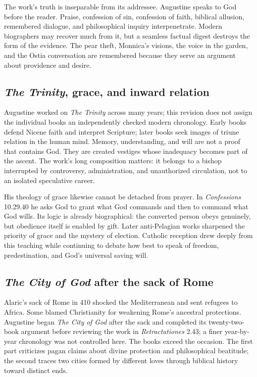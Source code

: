 The work's truth is inseparable from its addressee. Augustine speaks to God
before the reader. Praise, confession of sin, confession of faith, biblical
allusion, remembered dialogue, and philosophical inquiry interpenetrate.
Modern biographers may recover much from it, but a seamless factual digest
destroys the form of the evidence. The pear theft, Monnica's visions, the
voice in the garden, and the Ostia conversation are remembered because they
serve an argument about providence and desire.

\subsection{\emph{The Trinity}, grace, and inward relation}

Augustine worked on \emph{The Trinity} across many years; this revision does
not assign the individual books an independently checked modern chronology.
Early books defend Nicene faith and interpret
Scripture; later books seek images of triune relation in the human mind.
Memory, understanding, and will are not a proof that contains God. They are
created vestiges whose inadequacy becomes part of the ascent. The work's long
composition matters: it belongs to a bishop interrupted by controversy,
administration, and unauthorized circulation, not to an isolated speculative
career.

His theology of grace likewise cannot be detached from prayer. In
\emph{Confessions} 10.29.40 he asks God to grant what God commands and then to
command what God wills. Its logic is already biographical: the converted
person obeys genuinely, but obedience itself is enabled by gift. Later
anti-Pelagian works sharpened the
priority of grace and the mystery of election. Catholic reception drew deeply
from this teaching while continuing to debate how best to speak of freedom,
predestination, and God's universal saving will.

\subsection{\emph{The City of God} after the sack of Rome}

Alaric's sack of Rome in 410 shocked the Mediterranean and sent refugees to
Africa. Some blamed Christianity for weakening Rome's ancestral protections.
Augustine began \emph{The City of God} after the sack and completed its
twenty-two-book argument before reviewing the work in \emph{Retractationes}
2.43; a finer year-by-year chronology was not controlled here. The books exceed
the occasion. The first part criticizes pagan
claims about divine protection and philosophical beatitude; the second traces
two cities formed by different loves through biblical history toward distinct
ends.

